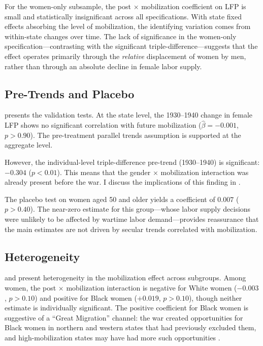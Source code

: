 \documentclass[12pt]{article}
\begin{document}
For the women-only subsample, the post $\times$ mobilization coefficient on LFP is small and statistically insignificant across all specifications. With state fixed effects absorbing the level of mobilization, the identifying variation comes from within-state changes over time. The lack of significance in the women-only specification---contrasting with the significant triple-difference---suggests that the effect operates primarily through the \textit{relative} displacement of women by men, rather than through an absolute decline in female labor supply.

\subsection{Pre-Trends and Placebo}

 presents the validation tests. At the state level, the 1930--1940 change in female LFP shows no significant correlation with future mobilization ($\hat{\beta} = -0.001$, $p > 0.90$). The pre-treatment parallel trends assumption is supported at the aggregate level.

However, the individual-level triple-difference pre-trend (1930--1940) is significant: $-0.304$ ($p < 0.01$). This means that the gender $\times$ mobilization interaction was already present before the war. I discuss the implications of this finding in .

The placebo test on women aged 50 and older yields a coefficient of $0.007$ ($p > 0.40$). The near-zero estimate for this group---whose labor supply decisions were unlikely to be affected by wartime labor demand---provides reassurance that the main estimates are not driven by secular trends correlated with mobilization.



\subsection{Heterogeneity}

 and  present heterogeneity in the mobilization effect across subgroups. Among women, the post $\times$ mobilization interaction is negative for White women ($-0.003$, $p > 0.10$) and positive for Black women ($+0.019$, $p > 0.10$), though neither estimate is individually significant. The positive coefficient for Black women is suggestive of a ``Great Migration'' channel: the war created opportunities for Black women in northern and western states that had previously excluded them, and high-mobilization states may have had more such opportunities \citep{collins2014great}.
\end{document}
